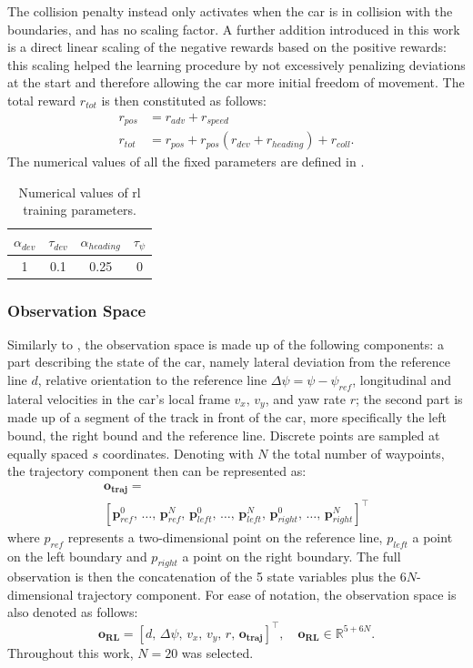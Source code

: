 \documentclass[letterpaper, conference]{IEEEtran}
\begin{document}
The collision penalty instead only activates when the car is in collision with the boundaries, and has no scaling factor. 
A further addition introduced in this work is a direct linear scaling of the negative rewards based on the positive rewards: this scaling helped the learning procedure by not excessively penalizing deviations at the start and therefore allowing the car more initial freedom of movement.
The total reward $r_{tot}$ is then constituted as follows:
\begin{align}
    r_{pos} &= r_{adv} + r_{speed}\\
    r_{tot} &= r_{pos} + r_{pos}\left(r_{dev} + r_{heading}\right) + r_{coll}.
\end{align}
The numerical values of all the fixed parameters are defined in .

\begin{table}[h]
    \centering
    \begin{tabular}{cccc}
        \toprule
        $\alpha_{dev}$ & $\tau_{dev}$ & $\alpha_{heading}$ & $\tau_{\psi}$ \\
        \midrule
        1 &  0.1 & 0.25 & 0\\
        \bottomrule
    \end{tabular}
    \caption{Numerical values of \gls{rl} training parameters.}
    \label{tab:params}
\end{table}
\subsubsection{Observation Space}
Similarly to \cite{Ghignone2023tcdriver}, the observation space is made up of the following components: a part describing the state of the car, namely lateral deviation from the reference line $d$, relative orientation to the reference line $\Delta\psi=\psi-\psi_{ref}$, longitudinal and lateral velocities in the car's local frame $v_x,\,v_y$, and yaw rate $r$; the second part is made up of a segment of the track in front of the car, more specifically the left bound, the right bound and the reference line. Discrete points are sampled at equally spaced $s$ coordinates. 
Denoting with $N$ the total number of waypoints, the trajectory component then can be represented as:
\begin{gather*}
    \mathbf{o_{traj}} = \\
    [\mathbf{p}_{ref}^0,\, \hdots,\,\mathbf{p}_{ref}^N,\,\mathbf{p}_{left}^0,\, \hdots,\,\mathbf{p}_{left}^N,\,\mathbf{p}_{right}^0,\, \hdots,\,\mathbf{p}_{right}^N]^\top
\end{gather*}
where $p_{ref}$ represents a two-dimensional point on the reference line, $p_{left}$ a point on the left boundary and $p_{right}$ a point on the right boundary.
The full observation is then the concatenation of the 5 state variables plus the $6N$-dimensional trajectory component. For ease of notation, the observation space is also denoted as follows:
\begin{equation}
    \mathbf{o_{RL}} = [d,\,\Delta \psi,\,v_x,\,v_y,\,r,\,\mathbf{o_{traj}}]^\top
    ,\quad \mathbf{o_{RL}}\in\mathbb{R}^{5+6N}.
\end{equation}
Throughout this work, $N=20$ was selected.
\end{document}
